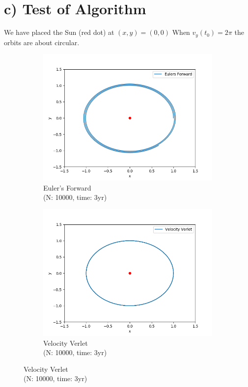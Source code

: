 \documentclass{article}
\begin{document}
\section*{c) Test of Algorithm}
We have placed the Sun (red dot) at $(x,y) = (0,0)$ 
When $v_y(t_0) = 2\pi$ the orbits are about circular. 
\begin{figure}[H]
  \centering
  \begin{subfigure}{0.5\textwidth}
    \centering
    \includegraphics[width=1.0\textwidth]{plots/euler_v_2pi_h10000_t3.png}
    \caption{Euler's Forward \\(N: 10000, time: 3yr)}
  \end{subfigure}%
  \begin{subfigure}{0.5\textwidth}
    \centering
    \includegraphics[width=1.0\textwidth]{plots/verlet_v_2pi_h10000_t3.png}
    \caption{Velocity Verlet \\(N: 10000, time: 3yr)}
  \end{subfigure}
\end{figure}
\end{document}
